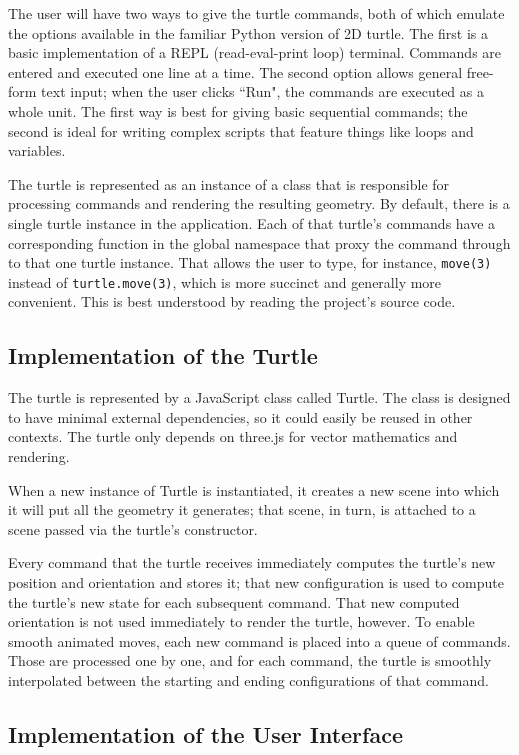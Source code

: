 \documentclass[12pt]{article}
\begin{document}
The user will have two ways to give the turtle commands, both of which emulate the options available in the familiar Python version of 2D turtle. The first is a basic implementation of a REPL (read-eval-print loop) terminal. Commands are entered and executed one line at a time. The second option allows general free-form text input; when the user clicks ``Run", the commands are executed as a whole unit. The first way is best for giving basic sequential commands; the second is ideal for writing complex scripts that feature things like loops and variables.

The turtle is represented as an instance of a class that is responsible for processing commands and rendering the resulting geometry. By default, there is a single turtle instance in the application. Each of that turtle's commands have a corresponding function in the global namespace that proxy the command through to that one turtle instance. That allows the user to type, for instance, \texttt{move(3)} instead of \texttt{turtle.move(3)}, which is more succinct and generally more convenient. This is best understood by reading the project's source code.

\subsection{Implementation of the Turtle}

The turtle is represented by a JavaScript class called Turtle. The class is designed to have minimal external dependencies, so it could easily be reused in other contexts. The turtle only depends on three.js for vector mathematics and rendering.

When a new instance of Turtle is instantiated, it creates a new scene into which it will put all the geometry it generates; that scene, in turn, is attached to a scene passed via the turtle's constructor.

Every command that the turtle receives immediately computes the turtle's new position and orientation and stores it; that new configuration is used to compute the turtle's new state for each subsequent command. That new computed orientation is not used immediately to render the turtle, however. To enable smooth animated moves, each new command is placed into a queue of commands. Those are processed one by one, and for each command, the turtle is smoothly interpolated between the starting and ending configurations of that command.

\subsection{Implementation of the User Interface}
\end{document}
